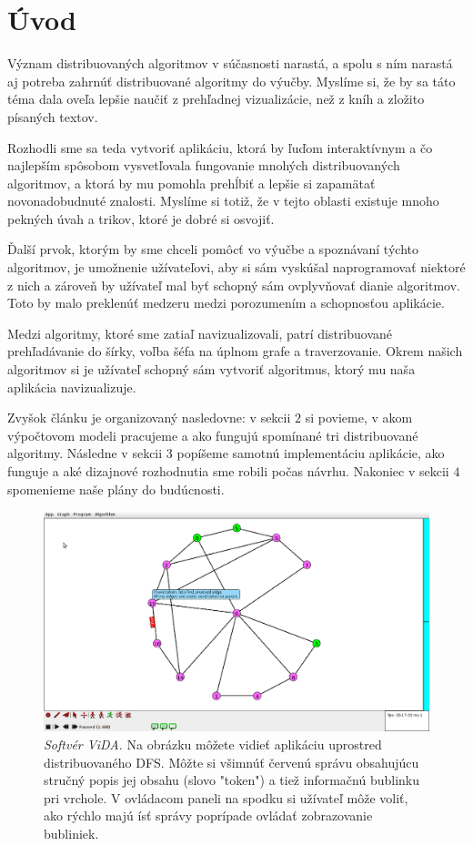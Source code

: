 \section{Úvod}

Význam distribuovaných algoritmov v súčasnosti narastá, a spolu s ním narastá aj potreba
zahrnúť distribuované algoritmy do výučby. Myslíme si, že by sa táto téma dala oveľa lepšie naučiť
z prehľadnej vizualizácie, než z kníh a zložito písaných textov.

Rozhodli sme sa teda vytvoriť aplikáciu, ktorá by ľuďom interaktívnym a čo najlepším spôsobom
vysvetľovala fungovanie mnohých distribuovaných algoritmov, a ktorá by mu pomohla prehĺbiť a lepšie si zapamätať
novonadobudnuté znalosti. Myslíme si totiž, že v tejto oblasti existuje mnoho pekných úvah a trikov,
ktoré je dobré si osvojiť. 

Ďalší prvok, ktorým by sme chceli pomôcť vo výučbe a spoznávaní týchto algoritmov, je umožnenie užívateľovi, 
aby si sám vyskúšal naprogramovať niektoré z nich a zároveň by užívateľ mal byť schopný sám
ovplyvňovať dianie algoritmov. Toto by malo preklenúť medzeru medzi porozumením a schopnosťou
aplikácie.

Medzi algoritmy, ktoré sme zatiaľ navizualizovali, patrí distribuované prehľadávanie do šírky,
voľba šéfa na úplnom grafe a traverzovanie. Okrem našich algoritmov si je užívateľ schopný
sám vytvoriť algoritmus, ktorý mu naša aplikácia navizualizuje.

Zvyšok článku je organizovaný nasledovne: v sekcii $2$ si povieme, v akom výpočtovom modeli
pracujeme a ako fungujú spomínané tri distribuované algoritmy. 
Následne v sekcii $3$ popíšeme samotnú implementáciu aplikácie, ako
funguje a aké dizajnové rozhodnutia sme robili počas návrhu. Nakoniec v sekcii $4$ spomenieme naše plány do budúcnosti.

\noindent
\begin{figure}
\centering
\includegraphics[width=2.01\columnwidth]{DFS.png}
\caption{\emph{Softvér ViDA.} Na obrázku môžete vidieť aplikáciu uprostred distribuovaného DFS. Môžte
si všimnúť červenú správu obsahujúcu stručný popis jej obsahu (slovo "token") a tiež informačnú
bublinku pri vrchole. V ovládacom paneli na spodku si užívateľ môže voliť, ako rýchlo majú ísť
správy poprípade ovládať zobrazovanie bubliniek.}
\label{img:historia} 
\end{figure}
